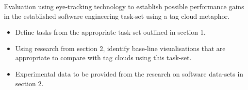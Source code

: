 
Evaluation using eye-tracking technology to establish possible performance gains in the established software engineering task-set using a tag cloud metaphor.

\begin{itemize}
	\item Define tasks from the appropriate task-set outlined in section 1.
	\item Using research from section 2, identify base-line visualisations that are appropriate to compare with tag clouds using this task-set.
	\item Experimental data to be provided from the research on software data-sets in section 2.
\end{itemize}



